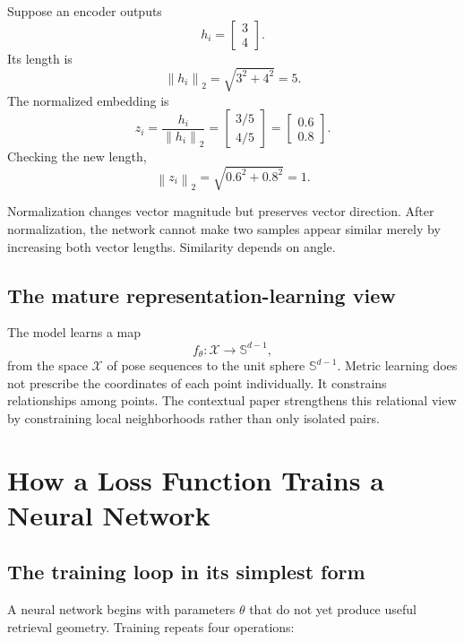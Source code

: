 \documentclass[11pt,oneside,openany]{book}
\theoremstyle{myplain}
\theoremstyle{definition}
\newcommand{\norm}[1]{\left\lVert #1\right\rVert}
\begin{document}
Suppose an encoder outputs
\[
  h_i=\begin{bmatrix}3\\4\end{bmatrix}.
\]
Its length is
\[
  \norm{h_i}_2=\sqrt{3^2+4^2}=5.
\]
The normalized embedding is
\[
  z_i=\frac{h_i}{\norm{h_i}_2}
  =\begin{bmatrix}3/5\\4/5\end{bmatrix}
  =\begin{bmatrix}0.6\\0.8\end{bmatrix}.
\]
Checking the new length,
\[
\norm{z_i}_2=\sqrt{0.6^2+0.8^2}=1.
\]

\begin{conceptbox}[title=What normalization changes and preserves]
Normalization changes vector magnitude but preserves vector direction. After normalization, the network cannot make two samples appear similar merely by increasing both vector lengths. Similarity depends on angle.
\end{conceptbox}

\section{The mature representation-learning view}

The model learns a map
\[
  f_\theta:\mathcal X\rightarrow\mathbb S^{d-1},
\]
from the space $\mathcal X$ of pose sequences to the unit sphere $\mathbb S^{d-1}$. Metric learning does not prescribe the coordinates of each point individually. It constrains relationships among points. The contextual paper strengthens this relational view by constraining local neighborhoods rather than only isolated pairs.


\chapter{How a Loss Function Trains a Neural Network}
\label{chap:training-primer}

\section{The training loop in its simplest form}

A neural network begins with parameters $\theta$ that do not yet produce useful retrieval geometry. Training repeats four operations:
\end{document}
